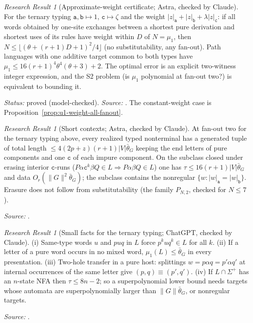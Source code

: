 \documentclass[11pt]{article}
\numberwithin{equation}{section}
\theoremstyle{plain}
\theoremstyle{definition}
\theoremstyle{remark}
\newtheorem{rresult}[theorem]{Research Result}
\theoremstyle{plain}
\begin{document}
\begin{rresult}[Approximate-weight certificate; Astra, checked by Claude]
\label{rr:approx-weight}
For the ternary typing $\mathtt a,\mathtt b\mapsto1$, $\mathtt c\mapsto\zeta$ and the weight
$|z|_{\mathtt a}+|z|_{\mathtt b}+\lambda|z|_{\mathtt c}$: if all words obtained by
one-site exchanges between a shortest pure derivation and shortest uses of its rules
have weight within $D$ of $N=\mu_1$, then $N\le\lfloor(\theta+(r+1)D+1)^2/4\rfloor$
(no substitutability, any fan-out).  Path languages with one additive target common
to both types have $\mu_1\le16(r+1)^4\theta^4(\theta+3)+2$.  The optimal error is an
explicit two-witness integer expression, and the S2 problem (is $\mu_1$ polynomial at
fan-out two?) is equivalent to bounding it.
\end{rresult}
\noindent\emph{Status:} proved (model-checked).  \emph{Source:}
.  The constant-weight case is
Proposition~\ref{prop:u1-weight-all-fanout}.

\begin{rresult}[Short contexts; Astra, checked by Claude]
\label{rr:short-context}
At fan-out two for the ternary typing above, every realized typed nonterminal has a
generated tuple of total length $\le4(2p+z)(r+1)|V|\bar\theta_G$ keeping the end
letters of pure components and one $\mathtt c$ of each impure component.  On the
subclass closed under erasing interior $\mathtt c$-runs
($P\alpha\mathtt c^k\beta Q\in L\Rightarrow P\alpha\beta Q\in L$) one has
$\tau\le16(r+1)|V|\bar\theta_G$ and data $O_r(\|G\|^2\bar\theta_G)$; the subclass contains
the nonregular $\{w:|w|_{\mathtt a}=|w|_{\mathtt b}\}$.  Erasure does not follow from
substitutability (the family $P_{N,2}$, checked for $N\le7$).
\end{rresult}
\noindent\emph{Source:} .

\begin{rresult}[Small facts for the ternary typing; ChatGPT, checked by Claude]
\label{rr:ternary-small}
(i) Same-type words $u$ and $puq$ in $L$ force $p^kuq^k\in L$ for all $k$.
(ii) If a letter of a pure word occurs in no mixed word, $\mu_1(L)\le\bar\theta_G$ in
every presentation.  (iii) Two-hole transfer in a pure host: splittings
$w=p\alpha q=p'\alpha q'$ at internal occurrences of the same letter give
$(p,q)\equiv(p',q')$.  (iv) If $L\cap\Sigma^+$ has an $n$-state NFA then
$\tau\le8n-2$; so a superpolynomial lower bound needs targets whose automata are
superpolynomially larger than $\|G\|\bar\theta_G$, or nonregular targets.
\end{rresult}
\noindent\emph{Source:} .
\end{document}
